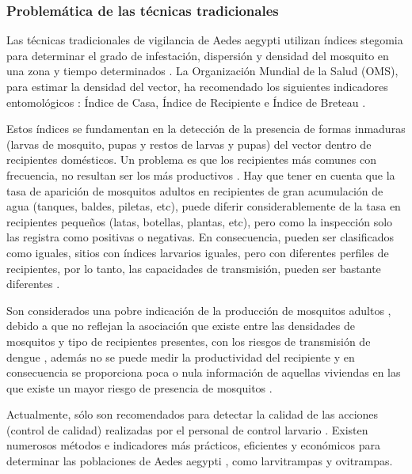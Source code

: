 \subsubsection{Problemática de las técnicas tradicionales}
Las técnicas tradicionales de vigilancia de Aedes aegypti utilizan índices stegomia para
determinar el grado de infestación, dispersión y densidad del mosquito en una zona y tiempo
determinados \cite{NINO2011}. La Organización Mundial de la Salud (OMS), para estimar la densidad
del vector, ha recomendado los siguientes indicadores entomológicos : Índice de Casa, Índice de
Recipiente e Índice de Breteau \cite{cenaprece2013}.

Estos índices se fundamentan en la detección de la presencia de formas inmaduras (larvas de
mosquito, pupas y restos de larvas y pupas) del vector dentro de recipientes domésticos. Un
problema es que los recipientes más comunes con frecuencia, no resultan ser los más
productivos \cite{world2009dengue}. Hay que tener en cuenta que la tasa de aparición de mosquitos
adultos en recipientes de gran acumulación de agua (tanques, baldes, piletas, etc), puede diferir
considerablemente de la tasa en recipientes pequeños (latas, botellas, plantas, etc), pero como
la inspección solo las registra como positivas o negativas. En consecuencia, pueden ser
clasificados como iguales, sitios con índices larvarios iguales, pero con diferentes perfiles de
recipientes, por lo tanto, las capacidades de transmisión, pueden ser bastante diferentes
\cite{world2009dengue}.

Son considerados una pobre indicación de la producción de mosquitos adultos
\cite{world2009dengue, cenaprece2013}, debido a que no reflejan la asociación que existe entre las
densidades de mosquitos y tipo de recipientes presentes, con los riesgos de transmisión de dengue
\cite{cenaprece2013}, además no se puede medir la productividad del recipiente
\cite{world2009dengue} y en consecuencia se proporciona poca o nula información de aquellas
viviendas en las que existe un mayor riesgo de presencia de mosquitos \cite{cenaprece2013}.

Actualmente, sólo son recomendados para detectar la calidad de las acciones (control de calidad)
realizadas por el personal de control larvario \cite{cenaprece2013}. Existen numerosos métodos e
indicadores más prácticos, eficientes y económicos para determinar las poblaciones de Aedes
aegypti \cite{cenaprece2013}, como larvitrampas y ovitrampas.
